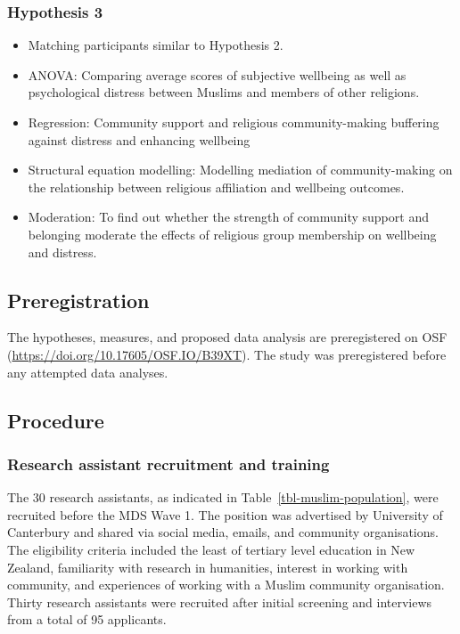 \documentclass[
]{interact}
\providecommand{\tightlist}{%
  \setlength{\itemsep}{0pt}\setlength{\parskip}{0pt}}\usepackage{longtable,booktabs,array}
\begin{document}
\subsubsection{Hypothesis 3}\label{hypothesis-3}

\begin{itemize}
\tightlist
\item
  Matching participants similar to Hypothesis 2.
\item
  ANOVA: Comparing average scores of subjective wellbeing as well as
  psychological distress between Muslims and members of other religions.
\item
  Regression: Community support and religious community-making buffering
  against distress and enhancing wellbeing
\item
  Structural equation modelling: Modelling mediation of community-making
  on the relationship between religious affiliation and wellbeing
  outcomes.
\item
  Moderation: To find out whether the strength of community support and
  belonging moderate the effects of religious group membership on
  wellbeing and distress.
\end{itemize}

\subsection{Preregistration}\label{preregistration}

The hypotheses, measures, and proposed data analysis are preregistered
on OSF (\url{https://doi.org/10.17605/OSF.IO/B39XT}). The study was
preregistered before any attempted data analyses.

\subsection{Procedure}\label{procedure}

\subsubsection{Research assistant recruitment and
training}\label{research-assistant-recruitment-and-training}

The 30 research assistants, as indicated in
Table~\ref{tbl-muslim-population}, were recruited before the MDS Wave 1.
The position was advertised by University of Canterbury and shared via
social media, emails, and community organisations. The eligibility
criteria included the least of tertiary level education in New Zealand,
familiarity with research in humanities, interest in working with
community, and experiences of working with a Muslim community
organisation. Thirty research assistants were recruited after initial
screening and interviews from a total of 95 applicants.
\end{document}

